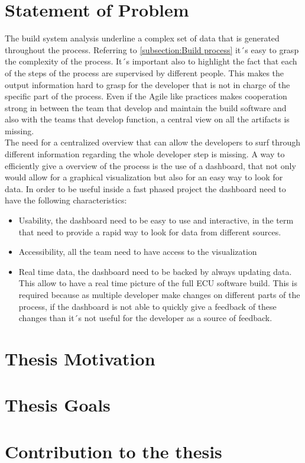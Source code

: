 \documentclass[../main.tex]{subfiles}
\begin{document}
\section{Statement of Problem}
The build system analysis underline a complex set of data that is generated throughout the process. Referring to \ref{subsection:Build process} it´s easy to grasp the complexity of the process. It´s important also to highlight the fact that each of the steps of the process are supervised by different people. This makes the output information hard to grasp for the developer that is not in charge of the specific part of the process. Even if the Agile like practices makes cooperation strong in between the team that develop and maintain the build software and also with the teams that develop function, a central view on all the artifacts is missing.\\
The need for a centralized overview that can allow the developers to surf through different information regarding the whole developer step is missing. A way to efficiently give a overview of the process is the use of a dashboard, that not only would allow for a graphical visualization but also for an easy way to look for data. In order to be useful inside a fast phased project the dashboard need to have the following characteristics:
\begin{itemize}
    \item Usability, the dashboard need to be easy to use and interactive, in the term that need to provide a rapid way to look for data from different sources. 
    \item Accessibility, all the team need to have access to the visualization
    \item Real time data, the dashboard need to be backed by always updating data. This allow to have a real time picture of the full ECU software build. This is required because as multiple developer make changes on different parts of the process, if the dashboard is not able to quickly give a feedback of these changes than it´s not useful for the developer as a source of feedback. 
\end{itemize}
\section{Thesis Motivation}
\section{Thesis Goals}
\section{Contribution to the thesis}
\cleardoublepage
\end{document}
